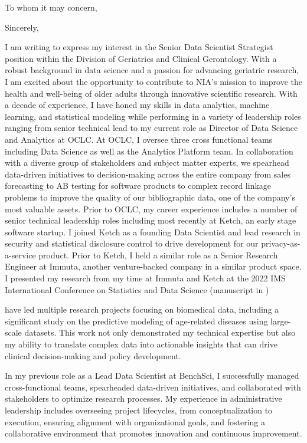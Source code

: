 \documentclass[11pt,letterpaper,sans]{moderncv}        %
\newcommand{\CompanyName}{National Institute on Aging}
\newcommand{\Location}{Bethesda, MD, United States}
\begin{document}
\recipient{\CompanyName}{\Location}
\date{\today}
\opening{To whom it may concern,}
\closing{Sincerely,}
\makelettertitle

I am writing to express my interest in the Senior Data Scientist Strategist position within the Division of Geriatrics and Clinical Gerontology. With a robust background in data science and a passion for advancing geriatric research, I am excited about the opportunity to contribute to NIA's mission to improve the health and well-being of older adults through innovative scientific research. With a decade of experience, I have honed my skills in data analytics, machine learning, and statistical modeling while performing in a variety of leadership roles ranging from senior technical lead to my current role as Director of Data Science and Analytics at OCLC. At OCLC, I oversee three cross functional teams including Data Science as well as the Analytics Platform team. In collaboration with a diverse group of stakeholders and subject matter experts, we spearhead data-driven initiatives to decision-making across the entire company from sales forecasting to AB testing for software products to complex record linkage problems to improve the quality of our bibliographic data, one of the company's most valuable assets.  Prior to OCLC, my career experience includes a number of senior technical leadership roles including most recently at Ketch, an early stage software startup. I joined Ketch as a founding Data Scientist and lead research in security and statistical disclosure control to drive development for our privacy-as-a-service product. Prior to Ketch, I held a similar role as a Senior Research Engineer at Immuta, another venture-backed company in a similar product space. I presented my research from my time at Immuta and Ketch at the 2022 IMS International Conference on Statistics and Data Science (manuscript in ) 

 have led multiple research projects focusing on biomedical data, including a significant study on the predictive modeling of age-related diseases using large-scale datasets. This work not only demonstrated my technical expertise but also my ability to translate complex data into actionable insights that can drive clinical decision-making and policy development.

In my previous role as a Lead Data Scientist at BenchSci, I successfully managed cross-functional teams, spearheaded data-driven initiatives, and collaborated with stakeholders to optimize research processes. My experience in administrative leadership includes overseeing project lifecycles, from conceptualization to execution, ensuring alignment with organizational goals, and fostering a collaborative environment that promotes innovation and continuous improvement.
\end{document}
